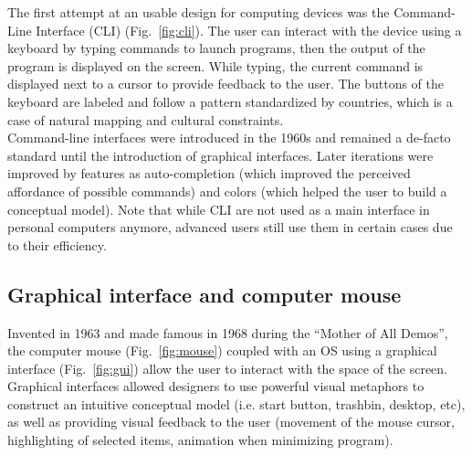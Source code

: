 \documentclass[a4paper,11pt] {article}
\theoremstyle{definition}
\begin{document}
    The first attempt at an usable design for computing devices was the Command-Line Interface (CLI) (Fig.~\ref{fig:cli}). The user can interact with the device using a keyboard by typing commands to launch programs, then the output of the program is displayed on the screen. While typing, the current command is displayed next to a cursor to provide feedback to the user. The buttons of the keyboard are labeled and follow a pattern standardized by countries, which is a case of natural mapping and cultural constraints.\\

    Command-line interfaces were introduced in the 1960s and remained a de-facto standard until the introduction of graphical interfaces. Later iterations were improved by features as auto-completion (which improved the perceived affordance of possible commands) and colors (which helped the user to build a conceptual model). Note that while CLI are not used as a main interface in personal computers anymore, advanced users still use them in certain cases due to their efficiency.

    \subsection{Graphical interface and computer mouse}

    Invented in 1963 and made famous in 1968 during the ``Mother of All Demos''\cite{engelbart1968research}, the computer mouse (Fig.~\ref{fig:mouse}) coupled with an OS using a graphical interface (Fig.~\ref{fig:gui}) allow the user to interact with the space of the screen. Graphical interfaces allowed designers to use powerful visual metaphors to construct an intuitive conceptual model (i.e. start button, trashbin, desktop, etc), as well as providing visual feedback to the user (movement of the mouse cursor, highlighting of selected items, animation when minimizing program).\\
\end{document}
